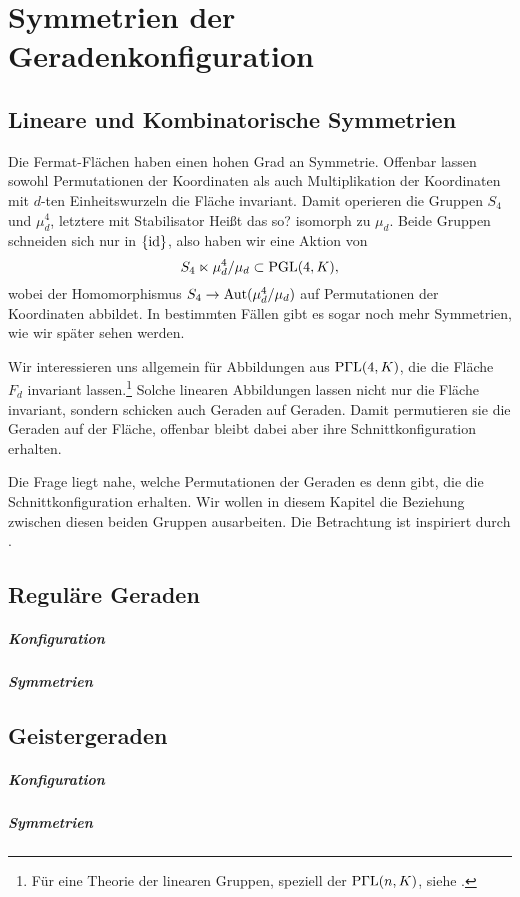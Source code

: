 \chapter{Symmetrien der Geradenkonfiguration} \label{chap:configsymm}
\section{Lineare und Kombinatorische Symmetrien}
Die Fermat-Flächen haben einen hohen Grad an Symmetrie. Offenbar lassen sowohl Permutationen der Koordinaten als auch Multiplikation der Koordinaten mit $d$-ten Einheitswurzeln die Fläche invariant. Damit operieren die Gruppen $S_4$ und $\mu_d^4$, letztere mit Stabilisator \note Heißt das so? isomorph zu $\mu_d$. Beide Gruppen schneiden sich nur in $\{\operatorname{id}\}$, also haben wir eine Aktion von
\begin{equation}
S_4 \ltimes \mu_d^4 / \mu_d \subset \mathrm{PGL}(4,K),
\end{equation}
wobei der Homomorphismus $S_4 \rightarrow \operatorname{Aut}(\mu_d^4 / \mu_d)$ auf Permutationen der Koordinaten abbildet. In bestimmten Fällen gibt es sogar noch mehr Symmetrien, wie wir später sehen werden.

Wir interessieren uns allgemein für Abbildungen aus $\mathrm{P\Gamma L}(4,K)$, die die Fläche $F_d$ invariant lassen.\footnote{Für eine Theorie der linearen Gruppen, speziell der $\mathrm{P\Gamma L}(n,K)$, siehe \cite{Dieudonne}.} Solche linearen Abbildungen lassen nicht nur die Fläche invariant, sondern schicken auch Geraden auf Geraden. Damit permutieren sie die Geraden auf der Fläche, offenbar bleibt dabei aber ihre Schnittkonfiguration erhalten.

Die Frage liegt nahe, welche Permutationen der Geraden es denn gibt, die die Schnittkonfiguration erhalten. Wir wollen in diesem Kapitel die Beziehung zwischen diesen beiden Gruppen ausarbeiten. Die Betrachtung ist inspiriert durch \cite[S.~180]{Mumford}.

\section{Reguläre Geraden}
\paragraph{Konfiguration}
\paragraph{Symmetrien}

\section{Geistergeraden}
\paragraph{Konfiguration}
\paragraph{Symmetrien}
